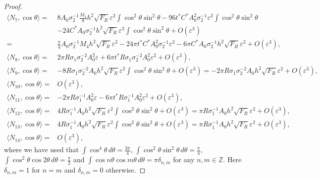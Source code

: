 \documentclass[12pt,reqno]{amsart}
\numberwithin{equation}{section}
\theoremstyle{definition}
\theoremstyle{remark}
\begin{document}
\begin{proof}
\begin{align*}
\langle N_7,\cos\theta \rangle=&8 A_0 \sigma_2^{-1}   \frac{M_4}{8}  h^2 \sqrt{F_R} \varepsilon^2\int \cos ^2 \theta \sin ^2 \theta- 96t^*   C^* A_0^2 \sigma_2^{-1}   \varepsilon^2   \int  \cos^2\theta \sin^2 \theta\\
&-24  C^* A_0 \sigma_2^{-1}h^2 \sqrt{F_R}\varepsilon^2\int \cos^2 \theta \sin ^2 \theta+O(\varepsilon^3)\\
=& \frac{\pi}{4} A_0 \sigma_2^{-1}    M_4   h^2 \sqrt{F_R} \varepsilon^2 - 24\pi t^*   C^* A_0^2 \sigma_2^{-1}   \varepsilon^2    -6\pi  C^* A_0 \sigma_2^{-1}h^2 \sqrt{F_R}\varepsilon^2+O(\varepsilon^3), \\
\langle N_8,\cos\theta \rangle=&2\pi R \sigma_1 \sigma_2^{-2} A_0^2\varepsilon + 6\pi t^*R \sigma_1 \sigma_2^{-2} A_0^2\varepsilon^2+O(\varepsilon^3) ,\\
\langle N_9,\cos\theta \rangle=&-8 R \sigma_1 \sigma_2^{-2} A_0 h^2 \sqrt{F_R} \varepsilon^2\int \cos ^2 \theta \sin ^2 \theta+O(\varepsilon^3)=-2\pi R \sigma_1 \sigma_2^{-2} A_0 h^2 \sqrt{F_R} \varepsilon^2 +O(\varepsilon^3),\\
\langle N_{10},\cos\theta \rangle=& O(\varepsilon^3),\\
\langle N_{11},\cos\theta \rangle=&-2\pi R  \sigma_1^{-1} A_0^2\varepsilon - 6\pi t^*R   \sigma_1^{-1} A_0^2\varepsilon^2  +O(\varepsilon^3),\\
\langle N_{12},\cos\theta \rangle=&4 R \sigma_1^{-1}   A_0 h^2 \sqrt{F_R} \varepsilon^2\int \cos ^2 \theta \sin ^2 \theta+O(\varepsilon^3)=\pi R \sigma_1^{-1}   A_0 h^2 \sqrt{F_R} \varepsilon^2  +O(\varepsilon^3),\\
\langle N_{13},\cos\theta \rangle=&4 R \sigma_1^{-1}   A_0 h^2 \sqrt{F_R} \varepsilon^2\int \cos ^2 \theta \sin ^2 \theta+O(\varepsilon^3)=\pi R \sigma_1^{-1}   A_0 h^2 \sqrt{F_R} \varepsilon^2  +O(\varepsilon^3),\\
\langle N_{14},\cos\theta \rangle=&O(\varepsilon^3) ,
\end{align*} 
where we have used that $ \int \cos^4 \theta \, d\theta=\frac{3\pi}{4} $, $ \int \cos^2 \theta \sin ^2 \theta\, d\theta=\frac{\pi}{4} $, $ \int \cos^2 \theta \cos2\theta\, d\theta =\frac{\pi}{2} $ and $ \int \cos n \theta \cos m\theta\, d\theta=\pi\delta_{n,m} $ for any $ n,m\in\mathbb{Z} $. Here $ \delta_{n,m}=1 $ for $ n=m $ and $ \delta_{n,m}=0 $ otherwise. 


\end{proof}
\end{document}
